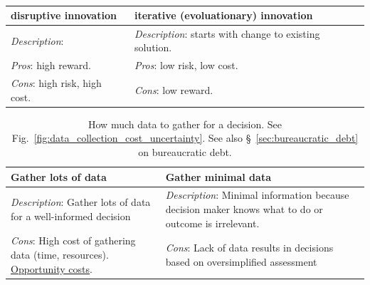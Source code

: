 \begin{center}
\begin{table}[ht]
\begin{tabular}{ | m{\dilemmatablewidth}| m{\dilemmatablewidth} | } 
  \hline
  \textbf{disruptive innovation} &
  \textbf{iterative (evoluationary) innovation} \\
  \hline
  \textit{Description}:   &
  \textit{Description}: starts with change to existing solution.  \\  
  \hline
  \textit{Pros}: high reward. & 
  \textit{Pros}: low risk, low cost. \\
  \hline
  \textit{Cons}: high risk, high cost. & 
  \textit{Cons}: low reward. \\
  \hline
\end{tabular}
\caption{
}
\label{table:disruptive-or-iterative}
\end{table}
\end{center}

\begin{center}
\begin{table}[ht]
\begin{tabular}{ | m{\dilemmatablewidth}| m{\dilemmatablewidth} | } 
  \hline
  \textbf{Gather lots of data} &
  \textbf{Gather minimal data} \\
  \hline
  \textit{Description}: Gather lots of data for a well-informed decision &
  \textit{Description}: Minimal information because decision maker knows what to do or outcome is irrelevant.  \\  
  \hline
  \textit{Cons}: High cost of gathering data (time, resources). \href{https://en.wikipedia.org/wiki/Opportunity_cost}{Opportunity costs}. & 
  \textit{Cons}: Lack of data results in decisions based on oversimplified assessment \\
  \hline
\end{tabular}
\caption{How much data to gather for a decision. See Fig.~\ref{fig:data_collection_cost_uncertainty}. See also \S~\ref{sec:bureaucratic_debt} on bureaucratic debt.
}
\label{table:gather_data_lots-vs-little}
\end{table}
\end{center}

